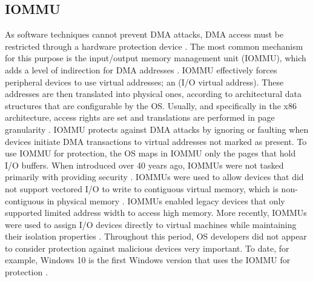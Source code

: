  \subsection{IOMMU}
As software techniques cannot prevent DMA attacks, DMA access must be restricted through a hardware protection device . The most common mechanism for this purpose is the input/output memory management unit (IOMMU), which adds a level of indirection for DMA addresses \cite{WRC08,YZ15,SB12,MTF12}. IOMMU effectively forces peripheral devices to use virtual addresses; an \iova(I/O virtual address). These addresses are then translated into physical ones, according to architectural data structures that are configurable by the OS. Usually, and specifically in the x86 architecture, access rights are set and translations are performed in page granularity \cite{Int16b, AMD16}. 
IOMMU protects against DMA attacks by ignoring or faulting when devices initiate DMA transactions to virtual addresses not marked as present. To use IOMMU for protection, the OS maps in IOMMU only the pages that hold I/O buffers. When introduced over 40 years ago, IOMMUs were not tasked primarily with providing security \cite{DWT79}. IOMMUs were used to allow devices that did not support vectored I/O to write to contiguous virtual memory, which is non-contiguous in physical memory \cite{Chu96, WMM97}. IOMMUs enabled legacy devices that only supported limited address width to access high memory. More recently, IOMMUs were used to assign I/O devices directly to virtual machines while maintaining their isolation properties \cite{Int16b, AMD16}. Throughout this period, OS developers did not appear to consider protection against malicious devices very important. To date, for example, Windows 10 is the first Windows version that uses the IOMMU for protection \cite{Mic17}.

